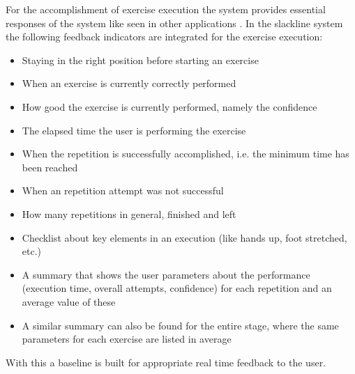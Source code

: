 For the accomplishment of exercise execution the system provides essential responses of the system like seen in other applications . In the slackline system the following feedback indicators are integrated for the exercise execution:
\begin{itemize}
\item Staying in the right position before starting an exercise
\item When an exercise is currently correctly performed
\item How good the exercise is currently performed, namely the confidence
\item The elapsed time the user is performing the exercise
\item When the repetition is successfully accomplished, i.e. the minimum time has been reached
\item When an repetition attempt was not successful
\item How many repetitions in general, finished and left
\item Checklist about key elements in an execution (like hands up, foot stretched, etc.)
\item A summary that shows the user parameters about the performance (execution time, overall attempts, confidence) for each repetition and an average value of these
\item A similar summary can also be found for the entire stage, where the same parameters for each exercise are listed in average
\end{itemize}
With this a baseline is built for appropriate real time feedback to the user.

